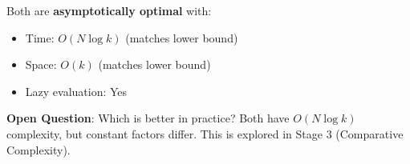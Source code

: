 \documentclass[11pt]{article}
\begin{document}
Both are \textbf{asymptotically optimal} with:
\begin{itemize}
    \item Time: $O(N \log k)$ (matches lower bound)
    \item Space: $O(k)$ (matches lower bound)
    \item Lazy evaluation: Yes
\end{itemize}

\textbf{Open Question}: Which is better in practice? Both have $O(N \log k)$ complexity, but constant factors differ. This is explored in Stage 3 (Comparative Complexity).
\end{document}
